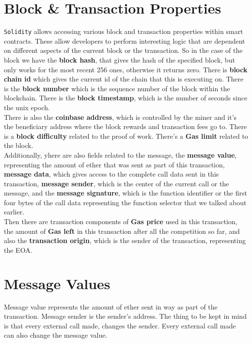 \section{Block \& Transaction Properties}
\texttt{Solidity} allows accessing various block and transaction properties within smart contracts. These allow developers to perform interesting logic that are dependent on different aspects of the current block or the transaction. So in the case of the block we have the \textbf{block hash}, that gives the hash of the specified block, but only works for the most recent 256 ones, otherwise it returns zero. There is \textbf{block chain id} which gives the current id of the chain that this is executing on. There is the \textbf{block number} which is the sequence number of the block within the blockchain. There is the \textbf{block timestamp}, which is the number of seconds since the unix epoch.\\

There is also the \textbf{coinbase address}, which is controlled by the miner and it's the beneficiary address where the block rewards and transaction fees go to. There is a \textbf{block difficulty} related to the proof of work. There's a \textbf{Gas limit} related to the block.\\

Additionally, yhere are also fields related to the message, the \textbf{message value}, representing the amount of ether that was sent as part of this transaction, \textbf{message data}, which gives access to the complete call data sent in this transaction, \textbf{message sender}, which is the center of the current call or the message, and the \textbf{message signature}, which is the function identifier or the first four bytes of the call data representing the function selector that we talked about earlier.\\

Then there are transaction components of \textbf{Gas price} used in this transaction, the amount of \textbf{Gas left} in this transaction after all the competition so far, and also the \textbf{transaction origin}, which is the sender of the transaction, representing the EOA.

\section{Message Values}
Message value represents the amount of ether sent in way as part of the transaction. Message sender is the sender's address. The thing to be kept in mind is that every external call made, changes the sender. Every external call made can also change the message value.\\

